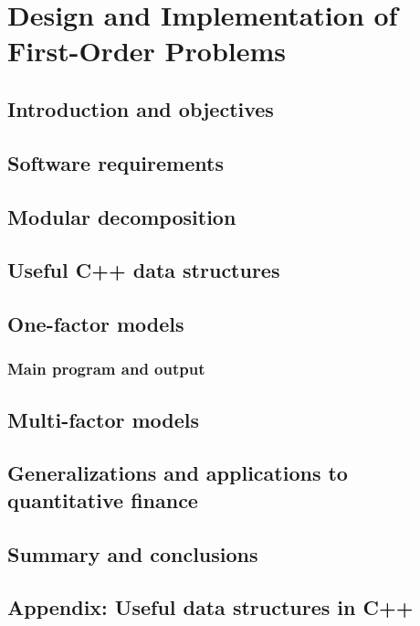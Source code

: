 \chapter{Design and Implementation of First-Order Problems}
\section{Introduction and objectives}

\section{Software requirements}

\section{Modular decomposition}

\section{Useful C++ data structures}

\section{One-factor models}

\subsection{Main program and output}

\section{Multi-factor models}

\section{Generalizations and applications to quantitative finance}

\section{Summary and conclusions}

\section{Appendix: Useful data structures in C++}